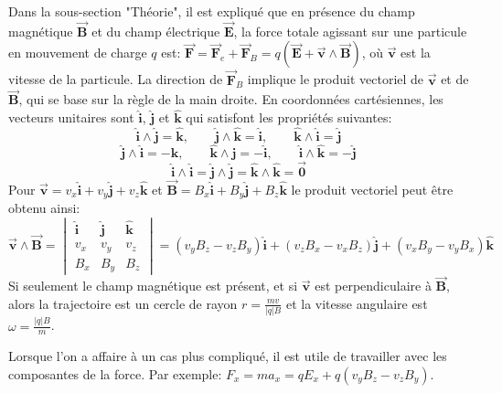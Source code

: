\documentclass[a4paper]{article}
\begin{document}
Dans la sous-section "Théorie", il est expliqué que en présence du champ magnétique $ \vec{\textbf{B}} $ et du champ électrique $ \vec{\textbf{E}} $, la force totale agissant sur une particule en mouvement de charge $ q $ est: $\displaystyle \vec{\textbf{F}} = \vec{\textbf{F}}_e + \vec{\textbf{F}}_B = q (\vec{\textbf{E}} + \vec{\textbf{v}} \wedge \vec{\textbf{B}}) $, où $ \vec{\textbf{v}} $ est la vitesse de la particule. La direction de $ \vec{\textbf{F}}_B $ implique le produit vectoriel de $ \vec{\textbf{v}} $ et de $ \vec{\textbf{B}} $, qui se base sur la règle de la main droite. En coordonnées cartésiennes, les vecteurs unitaires sont $ \hat{\textbf{i}} $, $ \hat{\textbf{j}} $ et $ \hat{\textbf{k}} $ qui satisfont les propriétés suivantes: 
\[ \hat{\textbf{i}} \wedge \hat{\textbf{j}} = \hat{\textbf{k}}, \qquad \hat{\textbf{j}} \wedge \hat{\textbf{k}} = \hat{\textbf{i}}, \qquad \hat{\textbf{k}} \wedge \hat{\textbf{i}} = \hat{\textbf{j}} \]
\[ \hat{\textbf{j}} \wedge \hat{\textbf{i}} = - \hat{\textbf{k}}, \qquad \hat{\textbf{k}} \wedge \hat{\textbf{j}} = - \hat{\textbf{i}}, \qquad \hat{\textbf{i}} \wedge \hat{\textbf{k}} = - \hat{\textbf{j}} \]
\[ \hat{\textbf{i}} \wedge \hat{\textbf{i}} = \hat{\textbf{j}} \wedge \hat{\textbf{j}} = \hat{\textbf{k}} \wedge \hat{\textbf{k}} = \vec{\textbf{0}} \]
Pour $ \vec{\textbf{v}} = v_x \hat{\textbf{i}} + v_y \hat{\textbf{j}} + v_z \hat{\textbf{k}} $ et $ \vec{\textbf{B}} = B_x \hat{\textbf{i}} + B_y \hat{\textbf{j}} + B_z \hat{\textbf{k}} $ le produit vectoriel peut être obtenu ainsi: 
\[ \vec{\textbf{v}} \wedge \vec{\textbf{B}} = 
\begin{vmatrix}
\hat{\textbf{i}} & \hat{\textbf{j}} & \hat{\textbf{k}} \\
v_x & v_y & v_z \\
B_x & B_y & B_z
\end{vmatrix}
= (v_y B_z - v_z B_y) \hat{\textbf{i}} + (v_z B_x - v_x B_z) \hat{\textbf{j}} + (v_x B_y - v_y B_x) \hat{\textbf{k}} \]
Si seulement le champ magnétique est présent, et si $ \vec{\textbf{v}} $ est perpendiculaire à $ \vec{\textbf{B}} $, alors la trajectoire est un cercle de rayon $\displaystyle r = \frac{m v}{|q| B} $ et la vitesse angulaire est $\displaystyle \omega = \frac{|q| B}{m} $.

Lorsque l'on a affaire à un cas plus compliqué, il est utile de travailler avec les composantes de la force. Par exemple: 
$\displaystyle F_x = m a_x = q E_x + q (v_y B_z - v_z B_y) $.
\end{document}
